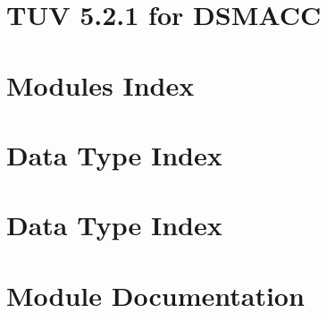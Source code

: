 \documentclass[twoside]{book}
\newcommand{\+}{\discretionary{\mbox{\scriptsize$\hookleftarrow$}}{}{}}
\begin{document}
\chapter{T\+UV 5.2.1 for D\+S\+M\+A\+CC}
\label{md_TUV_5_82_81_README}

\chapter{Modules Index}

\chapter{Data Type Index}

\chapter{Data Type Index}

\chapter{Module Documentation}







































\end{document}
